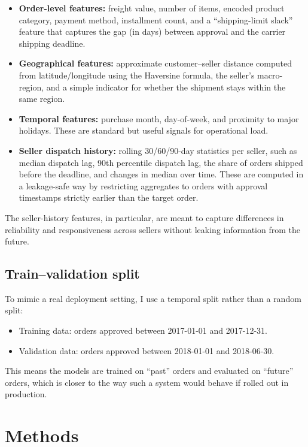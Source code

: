 \documentclass[10pt,twocolumn]{article}
\begin{document}
\begin{itemize}
  \item \textbf{Order-level features:} freight value, number of items, encoded product category, payment method, installment count, and a ``shipping-limit slack'' feature that captures the gap (in days) between approval and the carrier shipping deadline.
  \item \textbf{Geographical features:} approximate customer--seller distance computed from latitude/longitude using the Haversine formula, the seller's macro-region, and a simple indicator for whether the shipment stays within the same region.
  \item \textbf{Temporal features:} purchase month, day-of-week, and proximity to major holidays. These are standard but useful signals for operational load.
  \item \textbf{Seller dispatch history:} rolling 30/60/90-day statistics per seller, such as median dispatch lag, 90th percentile dispatch lag, the share of orders shipped before the deadline, and changes in median over time. These are computed in a leakage-safe way by restricting aggregates to orders with approval timestamps strictly earlier than the target order.
\end{itemize}

The seller-history features, in particular, are meant to capture differences in reliability and responsiveness across sellers without leaking information from the future.

\subsection{Train--validation split}
To mimic a real deployment setting, I use a temporal split rather than a random split:
\begin{itemize}
  \item Training data: orders approved between 2017-01-01 and 2017-12-31.
  \item Validation data: orders approved between 2018-01-01 and 2018-06-30.
\end{itemize}

This means the models are trained on ``past'' orders and evaluated on ``future'' orders, which is closer to the way such a system would behave if rolled out in production.

\section{Methods}
\end{document}
